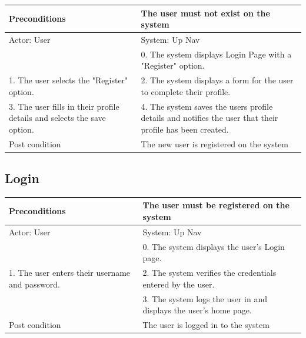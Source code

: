 \documentclass{article}
\begin{document}
\begin{enumerate}
	\begin{tabular}{ | m{15em} | m{15em}| }
		\hline
		Preconditions                                                       				& The user must not exist on the system \\ 				
		\hline
		Actor: User                                                       					& System: Up Nav \\ 			
		\hline
                                                                  							& 0. The system displays Login Page with a "Register" option. \\                                                           
		 \hline
		1. The user selects the "Register" option.					& 2.  The system displays a form for the user to complete their profile. \\				
		\hline
		3. The user fills in their profile details and selects the save option. 		& 4. The system saves the users profile details and notifies the user that their profile has been created. \\ 
		\hline
		Post condition                                                     				& The new user is registered on the system \\ 				
		\hline
	\end{tabular}

	\subsection{Login}
	
	\centering
	\begin{tabular}{ | m{15em} | m{15em}| }
		\hline
		Preconditions                                    												& The user must be registered on the system \\ 
		\hline
		Actor: User                                     												& System: Up Nav \\ 
		\hline
                                               		 													& 0. The system displays the user's Login page. \\ 
		\hline
		1. The user enters their username and password. 										& 2. The system verifies the credentials entered by the user. \\
		\hline
                                                															& 3. The system logs the user in and displays the user's home page. \\
		\hline
		Post condition                                  												& The user is logged in to the system \\ 
		\hline
	\end{tabular}



\end{enumerate}
\end{document}
